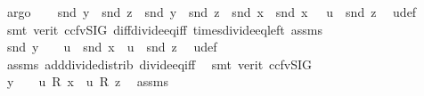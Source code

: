 \begin{isabellebody}
\ argo\isanewline
\ \ \isamarkupfalse%
\ {\isachardoublequoteopen}snd\ y\ {\isacharequal}{\kern0pt}\ {\isacharparenleft}{\kern0pt}{\isacharparenleft}{\kern0pt}snd\ z\ {\isacharminus}{\kern0pt}\ snd\ y{\isacharparenright}{\kern0pt}\ {\isacharslash}{\kern0pt}\ {\isacharparenleft}{\kern0pt}snd\ z\ {\isacharminus}{\kern0pt}\ snd\ x{\isacharparenright}{\kern0pt}{\isacharparenright}{\kern0pt}\ {\isacharasterisk}{\kern0pt}\ snd\ x\ {\isacharplus}{\kern0pt}\ \ u\ {\isacharasterisk}{\kern0pt}\ snd\ z{\isachardoublequoteclose}\ \isamarkupfalse%
\ u{\isacharunderscore}{\kern0pt}def\isanewline
\ \ \ \ \isamarkupfalse%
\ {\isacharparenleft}{\kern0pt}smt\ {\isacharparenleft}{\kern0pt}verit{\isacharcomma}{\kern0pt}\ ccfv{\isacharunderscore}{\kern0pt}SIG{\isacharparenright}{\kern0pt}\ diff{\isacharunderscore}{\kern0pt}divide{\isacharunderscore}{\kern0pt}eq{\isacharunderscore}{\kern0pt}iff\ times{\isacharunderscore}{\kern0pt}divide{\isacharunderscore}{\kern0pt}eq{\isacharunderscore}{\kern0pt}left\ assms{\isacharparenleft}{\kern0pt}{}{\isacharparenright}{\kern0pt}\ {}{\isacharparenright}{\kern0pt}\isanewline
\ \ \isamarkupfalse%
\ {\isachardoublequoteopen}snd\ y\ {\isacharequal}{\kern0pt}\ {\isacharparenleft}{\kern0pt}{}\ {\isacharminus}{\kern0pt}\ u{\isacharparenright}{\kern0pt}\ {\isacharasterisk}{\kern0pt}\ snd\ x\ {\isacharplus}{\kern0pt}\ u\ {\isacharasterisk}{\kern0pt}\ snd\ z{\isachardoublequoteclose}\ \isamarkupfalse%
\ u{\isacharunderscore}{\kern0pt}def\ \isanewline
\ \ \ \ \isamarkupfalse%
\ assms\ add{\isacharunderscore}{\kern0pt}divide{\isacharunderscore}{\kern0pt}distrib\ divide{\isacharunderscore}{\kern0pt}eq{\isacharunderscore}{\kern0pt}{}{\isacharunderscore}{\kern0pt}iff\ \isamarkupfalse%
\ {\isacharparenleft}{\kern0pt}smt\ {\isacharparenleft}{\kern0pt}verit{\isacharcomma}{\kern0pt}\ ccfv{\isacharunderscore}{\kern0pt}SIG{\isacharparenright}{\kern0pt}\ {\isachardoublequoteopen}{}{\isachardoublequoteclose}{\isacharparenright}{\kern0pt}\isanewline
\ \ \isamarkupfalse%
\ {\isachardoublequoteopen}y\ {\isacharequal}{\kern0pt}\ {\isacharparenleft}{\kern0pt}{}\ {\isacharminus}{\kern0pt}\ u{\isacharparenright}{\kern0pt}\ {\isacharasterisk}{\kern0pt}\isactrlsub R\ x\ {\isacharplus}{\kern0pt}\ u\ {\isacharasterisk}{\kern0pt}\isactrlsub R\ z{\isachardoublequoteclose}\ \isamarkupfalse%
\ assms\isanewline
\ \ \ \ \isamarkupfalse%

\end{isabellebody}
